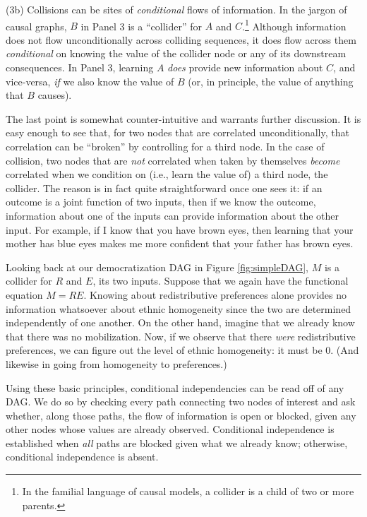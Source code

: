 \documentclass[
  12pt,
]{book}
\begin{document}
(3b) Collisions can be sites of \emph{conditional} flows of information. In the jargon of causal graphs, \(B\) in Panel 3 is a ``collider'' for \(A\) and \(C\).\footnote{In the familial language of causal models, a collider is a child of two or more parents.} Although information does not flow unconditionally across colliding sequences, it does flow across them \emph{conditional} on knowing the value of the collider node or any of its downstream consequences. In Panel 3, learning \(A\) \emph{does} provide new information about \(C\), and vice-versa, \emph{if} we also know the value of \(B\) (or, in principle, the value of anything that \(B\) causes).

The last point is somewhat counter-intuitive and warrants further discussion. It is easy enough to see that, for two nodes that are correlated unconditionally, that correlation can be ``broken'' by controlling for a third node. In the case of collision, two nodes that are \emph{not} correlated when taken by themselves \emph{become} correlated when we condition on (i.e., learn the value of) a third node, the collider. The reason is in fact quite straightforward once one sees it: if an outcome is a joint function of two inputs, then if we know the outcome, information about one of the inputs can provide information about the other input. For example, if I know that you have brown eyes, then learning that your mother has blue eyes makes me more confident that your father has brown eyes.

Looking back at our democratization DAG in Figure \ref{fig:simpleDAG}, \(M\) is a collider for \(R\) and \(E\), its two inputs. Suppose that we again have the functional equation \(M=RE\). Knowing about redistributive preferences alone provides no information whatsoever about ethnic homogeneity since the two are determined independently of one another. On the other hand, imagine that we already know that there was no mobilization. Now, if we observe that there \emph{were} redistributive preferences, we can figure out the level of ethnic homogeneity: it must be 0. (And likewise in going from homogeneity to preferences.)

Using these basic principles, conditional independencies can be read off of any DAG. We do so by checking every path connecting two nodes of interest and ask whether, along those paths, the flow of information is open or blocked, given any other nodes whose values are already observed. Conditional independence is established when \emph{all} paths are blocked given what we already know; otherwise, conditional independence is absent.
\end{document}
